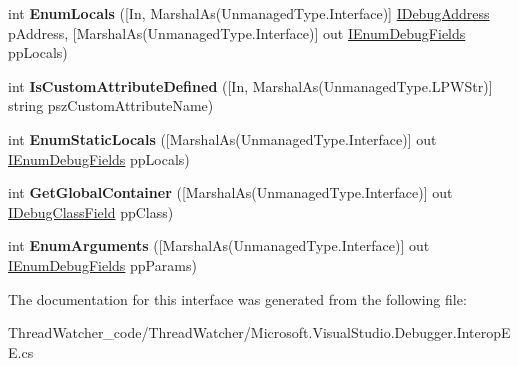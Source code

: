 \begin{DoxyCompactItemize}
\item 
\hypertarget{interface_microsoft_1_1_visual_studio_1_1_debugger_1_1_interop_e_e_1_1_i_debug_method_field_a7bb616e4620047972334abce5d15099d}{int {\bfseries Enum\+Locals} (\mbox{[}In, Marshal\+As(Unmanaged\+Type.\+Interface)\mbox{]} \hyperlink{interface_microsoft_1_1_visual_studio_1_1_debugger_1_1_interop_e_e_1_1_i_debug_address}{I\+Debug\+Address} p\+Address, \mbox{[}Marshal\+As(Unmanaged\+Type.\+Interface)\mbox{]} out \hyperlink{interface_microsoft_1_1_visual_studio_1_1_debugger_1_1_interop_e_e_1_1_i_enum_debug_fields}{I\+Enum\+Debug\+Fields} pp\+Locals)}\label{interface_microsoft_1_1_visual_studio_1_1_debugger_1_1_interop_e_e_1_1_i_debug_method_field_a7bb616e4620047972334abce5d15099d}

\item 
\hypertarget{interface_microsoft_1_1_visual_studio_1_1_debugger_1_1_interop_e_e_1_1_i_debug_method_field_a1056d32e77baaa424e166e7dcae5e9ee}{int {\bfseries Is\+Custom\+Attribute\+Defined} (\mbox{[}In, Marshal\+As(Unmanaged\+Type.\+L\+P\+W\+Str)\mbox{]} string psz\+Custom\+Attribute\+Name)}\label{interface_microsoft_1_1_visual_studio_1_1_debugger_1_1_interop_e_e_1_1_i_debug_method_field_a1056d32e77baaa424e166e7dcae5e9ee}

\item 
\hypertarget{interface_microsoft_1_1_visual_studio_1_1_debugger_1_1_interop_e_e_1_1_i_debug_method_field_a111229148bbbc080956fb22039cf2a83}{int {\bfseries Enum\+Static\+Locals} (\mbox{[}Marshal\+As(Unmanaged\+Type.\+Interface)\mbox{]} out \hyperlink{interface_microsoft_1_1_visual_studio_1_1_debugger_1_1_interop_e_e_1_1_i_enum_debug_fields}{I\+Enum\+Debug\+Fields} pp\+Locals)}\label{interface_microsoft_1_1_visual_studio_1_1_debugger_1_1_interop_e_e_1_1_i_debug_method_field_a111229148bbbc080956fb22039cf2a83}

\item 
\hypertarget{interface_microsoft_1_1_visual_studio_1_1_debugger_1_1_interop_e_e_1_1_i_debug_method_field_af96fb21deb4ed80d8db7d793967d0e56}{int {\bfseries Get\+Global\+Container} (\mbox{[}Marshal\+As(Unmanaged\+Type.\+Interface)\mbox{]} out \hyperlink{interface_microsoft_1_1_visual_studio_1_1_debugger_1_1_interop_e_e_1_1_i_debug_class_field}{I\+Debug\+Class\+Field} pp\+Class)}\label{interface_microsoft_1_1_visual_studio_1_1_debugger_1_1_interop_e_e_1_1_i_debug_method_field_af96fb21deb4ed80d8db7d793967d0e56}

\item 
\hypertarget{interface_microsoft_1_1_visual_studio_1_1_debugger_1_1_interop_e_e_1_1_i_debug_method_field_a3975487502f2ba9236dad0989dd01600}{int {\bfseries Enum\+Arguments} (\mbox{[}Marshal\+As(Unmanaged\+Type.\+Interface)\mbox{]} out \hyperlink{interface_microsoft_1_1_visual_studio_1_1_debugger_1_1_interop_e_e_1_1_i_enum_debug_fields}{I\+Enum\+Debug\+Fields} pp\+Params)}\label{interface_microsoft_1_1_visual_studio_1_1_debugger_1_1_interop_e_e_1_1_i_debug_method_field_a3975487502f2ba9236dad0989dd01600}

\end{DoxyCompactItemize}


The documentation for this interface was generated from the following file\+:\begin{DoxyCompactItemize}
\item 
Thread\+Watcher\+\_\+code/\+Thread\+Watcher/Microsoft.\+Visual\+Studio.\+Debugger.\+Interop\+E\+E.\+cs\end{DoxyCompactItemize}
